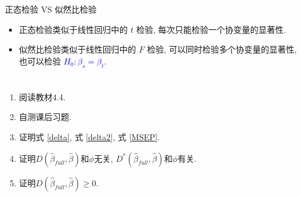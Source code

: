 \documentclass[professionalfont]{beamer}
\newcommand{\blue}[1]{\textcolor{blue}{#1}}
\begin{document}
\begin{frame}{正态检验 VS 似然比检验}
	\begin{itemize}
		\item 正态检验类似于线性回归中的 $t$ 检验, 每次只能检验一个协变量的显著性.
		\item 似然比检验类似于线性回归中的 $F$ 检验, 可以同时检验多个协变量的显著性, 也可以检验 \blue{$H_0: \beta_s=\beta_t$}.
	\end{itemize}
\end{frame}
\section*{}

\begin{frame}
	\begin{enumerate}
		\item 阅读教材4.4.
		\item 自测课后习题. 
		\item 证明式 \eqref{delta}, 式 \eqref{delta2}, 式 \eqref{MSEP}.
		\item 证明$D(\hat{\beta}_{full},\hat{\beta})$和$\phi$无关, $D^*(\hat{\beta}_{full},\hat{\beta})$和$\phi$有关. 
\item 证明$D(\hat{\beta}_{full},\hat{\beta})\geq0$. 
	\end{enumerate}
\end{frame}
\end{document}
